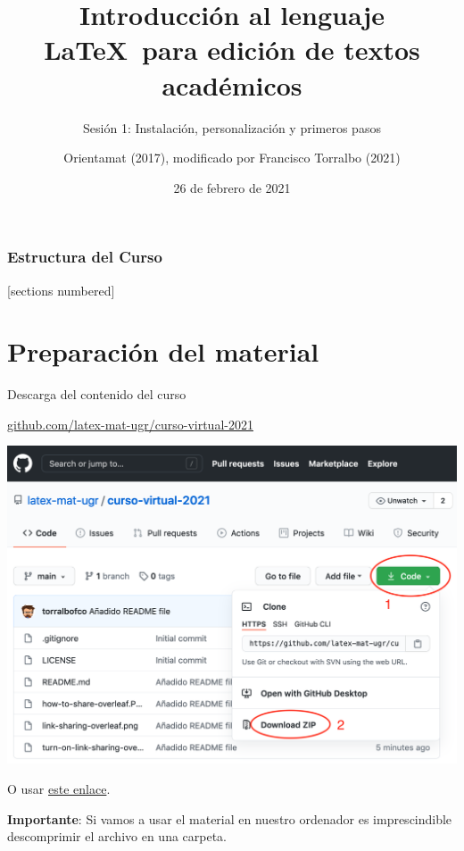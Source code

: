 \documentclass[10pt,xcolor=svgnames]{beamer}
\title{Introducción al lenguaje \LaTeX\ para edición de textos académicos}
\subtitle{Sesión 1: Instalación, personalización y primeros pasos}
\author{Orientamat (2017), modificado por Francisco Torralbo (2021)}
\institute{Universidad de Granada}
\date[2021]{26 de febrero de 2021}
\begin{document}
\maketitle

\begin{frame}
  \frametitle{Estructura del Curso}
  [sections numbered]
  \tableofcontents[hideallsubsections]
\end{frame}

\section{Preparación del material}

\begin{frame}{Descarga del contenido del curso}

  \url{github.com/latex-mat-ugr/curso-virtual-2021}

  \begin{center}
  \includegraphics[width=0.6\linewidth]{download-repositorio-github.png} 
  \end{center}

  O usar \href{https://github.com/latex-mat-ugr/curso-virtual-2021/archive/main.zip}{este enlace}.

  \textbf{Importante}: Si vamos a usar el material en nuestro ordenador es imprescindible descomprimir el archivo en una carpeta.
\end{frame}
\end{document}

